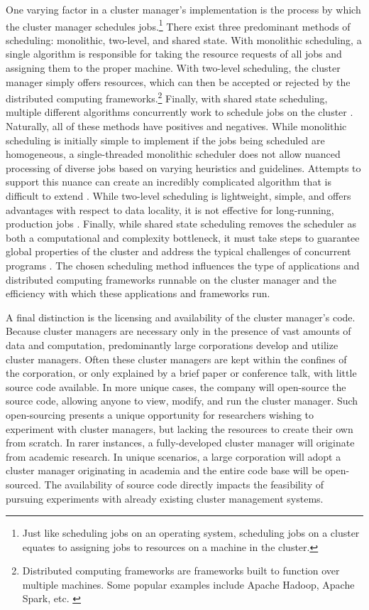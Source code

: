 One varying factor in a cluster manager's implementation is the process
by which the cluster manager schedules jobs.\footnote{Just like scheduling jobs
on an operating system, scheduling jobs on
a cluster equates to assigning jobs to resources on a machine in the cluster.}
There exist three predominant methods of scheduling: monolithic, two-level, and
shared state. With monolithic scheduling, a single algorithm
is responsible for taking the resource requests of all jobs and assigning them
to the proper machine. With two-level scheduling, the cluster manager simply
offers resources, which can then be accepted or rejected by the distributed
computing frameworks.\footnote{Distributed computing frameworks are frameworks
built to function over multiple machines. Some popular examples include
Apache Hadoop, Apache Spark, etc. \cite{mesos}}
Finally, with shared state scheduling, multiple different algorithms concurrently work to
schedule jobs on the cluster \cite{omega}. Naturally, all
of these methods have positives and negatives. While monolithic scheduling is
initially simple to implement if the jobs being scheduled are homogeneous,
a single-threaded monolithic scheduler does not allow
nuanced processing of diverse jobs based on varying heuristics and guidelines.
Attempts to support this nuance can create an incredibly
complicated algorithm that is difficult to extend \cite{omega}.
While two-level scheduling is lightweight, simple, and offers advantages with respect to
data locality, it is not effective for long-running,
production jobs \cite{omega}.
Finally, while shared state scheduling removes the scheduler as
both a computational and complexity bottleneck, it must take steps to guarantee
global properties of the cluster and address the typical challenges of
concurrent programs \cite{omega}.
The chosen scheduling method
influences the type of applications and distributed computing frameworks
runnable on the cluster manager and the efficiency with which these applications
and frameworks run.

A final distinction is the licensing and availability of the cluster manager's code.
Because cluster managers are necessary only in the presence of vast amounts of
data and computation, predominantly large
corporations develop and utilize cluster managers. Often these cluster
managers are kept within the confines of the corporation, or only explained by a
brief paper or conference talk, with little source code available. In more
unique cases, the company will open-source the source code, allowing anyone to
view, modify, and run the cluster manager. Such open-sourcing presents a unique opportunity
for researchers wishing to experiment with cluster managers, but lacking the
resources to create their own from scratch. In rarer instances, a
fully-developed cluster manager will originate from academic research. In unique
scenarios, a large corporation will adopt a cluster manager originating in
academia and the entire code base will
be open-sourced. The availability of source code directly impacts the
feasibility of pursuing experiments with already existing cluster management
systems.

